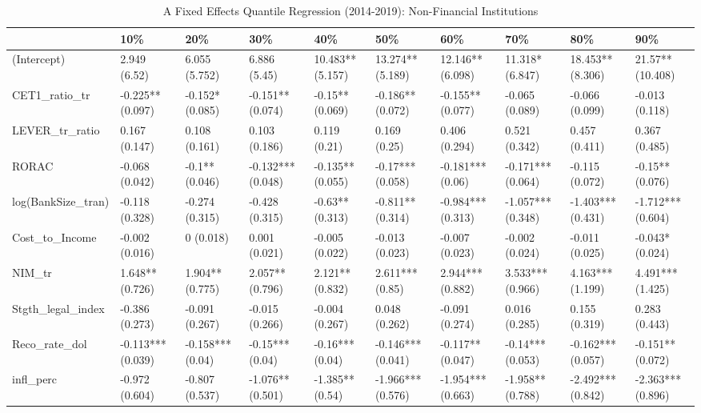 \begin{table}[ht]
\centering
\caption{A Fixed Effects Quantile Regression (2014-2019): Non-Financial Institutions} 
\begingroup\small
\begin{tabular}{llllllllll}
  \toprule
 & 10\% & 20\% & 30\% & 40\% & 50\% & 60\% & 70\% & 80\% & 90\% \\ 
  \midrule
(Intercept) & 2.949 (6.52) & 6.055 (5.752) & 6.886 (5.45) & 10.483** (5.157) & 13.274** (5.189) & 12.146** (6.098) & 11.318* (6.847) & 18.453** (8.306) & 21.57** (10.408) \\ 
  CET1\_ratio\_tr & -0.225** (0.097) & -0.152* (0.085) & -0.151** (0.074) & -0.15** (0.069) & -0.186** (0.072) & -0.155** (0.077) & -0.065 (0.089) & -0.066 (0.099) & -0.013 (0.118) \\ 
  LEVER\_tr\_ratio & 0.167 (0.147) & 0.108 (0.161) & 0.103 (0.186) & 0.119 (0.21) & 0.169 (0.25) & 0.406 (0.294) & 0.521 (0.342) & 0.457 (0.411) & 0.367 (0.485) \\ 
  RORAC & -0.068 (0.042) & -0.1** (0.046) & -0.132*** (0.048) & -0.135** (0.055) & -0.17*** (0.058) & -0.181*** (0.06) & -0.171*** (0.064) & -0.115 (0.072) & -0.15** (0.076) \\ 
  log(BankSize\_tran) & -0.118 (0.328) & -0.274 (0.315) & -0.428 (0.315) & -0.63** (0.313) & -0.811** (0.314) & -0.984*** (0.313) & -1.057*** (0.348) & -1.403*** (0.431) & -1.712*** (0.604) \\ 
  Cost\_to\_Income & -0.002 (0.016) & 0 (0.018) & 0.001 (0.021) & -0.005 (0.022) & -0.013 (0.023) & -0.007 (0.023) & -0.002 (0.024) & -0.011 (0.025) & -0.043* (0.024) \\ 
  NIM\_tr & 1.648** (0.726) & 1.904** (0.775) & 2.057** (0.796) & 2.121** (0.832) & 2.611*** (0.85) & 2.944*** (0.882) & 3.533*** (0.966) & 4.163*** (1.199) & 4.491*** (1.425) \\ 
  Stgth\_legal\_index & -0.386 (0.273) & -0.091 (0.267) & -0.015 (0.266) & -0.004 (0.267) & 0.048 (0.262) & -0.091 (0.274) & 0.016 (0.285) & 0.155 (0.319) & 0.283 (0.443) \\ 
  Reco\_rate\_dol & -0.113*** (0.039) & -0.158*** (0.04) & -0.15*** (0.04) & -0.16*** (0.04) & -0.146*** (0.041) & -0.117** (0.047) & -0.14*** (0.053) & -0.162*** (0.057) & -0.151** (0.072) \\ 
  infl\_perc & -0.972 (0.604) & -0.807 (0.537) & -1.076** (0.501) & -1.385** (0.54) & -1.966*** (0.576) & -1.954*** (0.663) & -1.958** (0.788) & -2.492*** (0.842) & -2.363*** (0.896) \\ 

\end{tabular}
\end{table}
